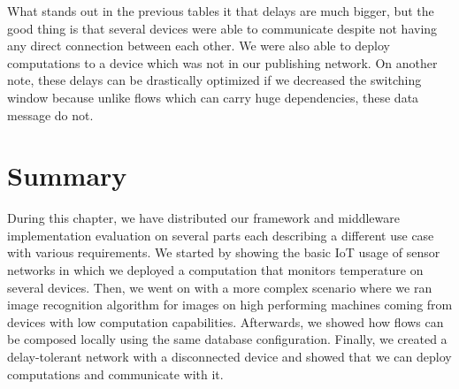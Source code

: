 \noindent What stands out in the previous tables it that delays are much bigger, but the good thing is that several devices were able to communicate despite not having any direct connection between each other. We were also able to deploy computations to a device which was not in our publishing network. On another note, these delays can be drastically optimized if we decreased the switching window because unlike flows which can carry huge dependencies, these data message do not.

\section{Summary}

During this chapter, we have distributed our framework and middleware implementation evaluation on several parts each describing a different use case with various requirements. We started by showing the basic IoT usage of sensor networks in which we deployed a computation that monitors temperature on several devices.  Then, we went on with a more complex scenario where we ran image recognition algorithm for images on high performing machines coming from devices with low computation capabilities. Afterwards, we showed how flows can be composed locally using the same database configuration. Finally, we created a delay-tolerant network with a disconnected device and showed that we can deploy computations and communicate with it.
